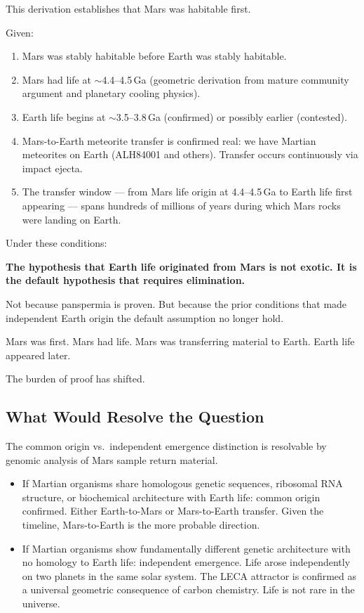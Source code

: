 \documentclass[11pt, a4paper]{article}
\begin{document}
This derivation establishes that Mars
was habitable first.

Given:

\begin{enumerate}[leftmargin=*, label=(\arabic*)]
\item Mars was stably habitable
  before Earth was stably habitable.
\item Mars had life at $\sim$4.4--4.5\,Ga
  (geometric derivation from mature
  community argument and planetary
  cooling physics).
\item Earth life begins at $\sim$3.5--3.8\,Ga
  (confirmed) or possibly earlier
  (contested).
\item Mars-to-Earth meteorite transfer
  is confirmed real:
  we have Martian meteorites on Earth
  (ALH84001 and others).
  Transfer occurs continuously via
  impact ejecta.
\item The transfer window --- from Mars
  life origin at 4.4--4.5\,Ga to
  Earth life first appearing ---
  spans hundreds of millions of years
  during which Mars rocks were
  landing on Earth.
\end{enumerate}

Under these conditions:

\textbf{The hypothesis that Earth life
originated from Mars is not exotic.
It is the default hypothesis that requires
elimination.}

Not because panspermia is proven.
But because the prior conditions that
made independent Earth origin the
default assumption no longer hold.

Mars was first.
Mars had life.
Mars was transferring material to Earth.
Earth life appeared later.

The burden of proof has shifted.

\subsection{What Would Resolve the Question}

The common origin vs.\ independent emergence
distinction is resolvable by genomic analysis
of Mars sample return material.

\begin{itemize}[leftmargin=*]
\item If Martian organisms share
  homologous genetic sequences,
  ribosomal RNA structure, or
  biochemical architecture with
  Earth life: common origin confirmed.
  Either Earth-to-Mars or
  Mars-to-Earth transfer.
  Given the timeline, Mars-to-Earth
  is the more probable direction.
\item If Martian organisms show
  fundamentally different genetic
  architecture with no homology
  to Earth life: independent emergence.
  Life arose independently on two
  planets in the same solar system.
  The LECA attractor is confirmed
  as a universal geometric consequence
  of carbon chemistry.
  Life is not rare in the universe.
\end{itemize}
\end{document}
